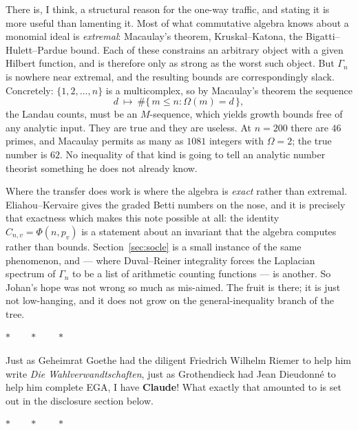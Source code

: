 \documentclass[a4paper,11pt,oneside,reqno]{amsart}
\theoremstyle{definition}
\theoremstyle{remark}
\theoremstyle{plain}
\newcommand{\Om}{\Omega}
\newcommand{\Gam}{\Gamma}
\begin{document}
There is, I think, a structural reason for the one-way traffic, and stating it
is more useful than lamenting it. Most of what commutative algebra knows about
a monomial ideal is \emph{extremal}: Macaulay's theorem, Kruskal--Katona, the
Bigatti--Hulett--Pardue bound. Each of these constrains an arbitrary object with
a given Hilbert function, and is therefore only as strong as the worst such
object. But \(\Gam_n\) is nowhere near extremal, and the resulting bounds are
correspondingly slack. Concretely: \(\{1,2,\dots,n\}\) is a multicomplex, so by
Macaulay's theorem the sequence
\[
  d\ \longmapsto\ \#\{\,m \le n : \Om(m) = d\,\},
\]
the Landau counts, must be an \(M\)-sequence, which yields growth bounds free of
any analytic input. They are true and they are useless. At \(n = 200\) there are
\(46\) primes, and Macaulay permits as many as \(1081\) integers with
\(\Om = 2\); the true number is \(62\). No inequality of that kind is going to
tell an analytic number theorist something he does not already know.

Where the transfer does work is where the algebra is \emph{exact} rather than
extremal. Eliahou--Kervaire gives the graded Betti numbers on the nose, and it
is precisely that exactness which makes this note possible at all: the identity
\(C_{n,v} = \Phi(n,p_v)\) is a statement about an invariant that the algebra
computes rather than bounds. Section~\ref{sec:socle} is a small instance of the
same phenomenon, and \cite{SnellmanLaplacians} --- where Duval--Reiner
integrality forces the Laplacian spectrum of \(\Gam_n\) to be a list of
arithmetic counting functions --- is another. So Johan's hope was not wrong so
much as mis-aimed. The fruit is there; it is just not low-hanging, and it does
not grow on the general-inequality branch of the tree.

\begin{center}\small\(\ast\qquad\ast\qquad\ast\)\end{center}

Just as Geheimrat Goethe had the diligent Friedrich Wilhelm Riemer to help him
write \emph{Die Wahlverwandtschaften}, just as Grothendieck had Jean Dieudonné
to help him complete EGA, I have \textbf{Claude}! What exactly that amounted to
is set out in the disclosure section below.

\begin{center}\small\(\ast\qquad\ast\qquad\ast\)\end{center}
\end{document}
